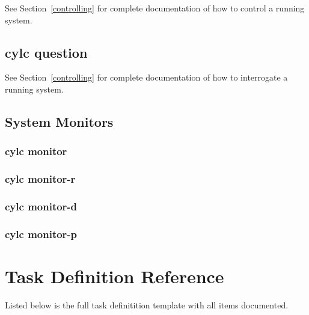 \documentclass[11pt,a4paper]{article}
\begin{document}
See Section~\ref{controlling} for complete documentation of how to
control a running system.

{

}

\pagebreak
\subsection{cylc question}
\label{cylcquestion}

See Section~\ref{controlling} for complete documentation of how to
interrogate a running system.

{

}

\pagebreak
\pagebreak 
\subsection{System Monitors}
\label{Systemmonitors}

\subsubsection{cylc monitor}
\label{cylcmonitor}
{

}

\pagebreak
\subsubsection{cylc monitor-r}
\label{cylcmonitor-r}
{

}

\pagebreak
\subsubsection{cylc monitor-d}
\label{cylcmonitor-d}
{

}

\subsubsection{cylc monitor-p}
\label{cylcmonitor-p}
{

}

\pagebreak
\section{Task Definition Reference}
\label{TaskDefinitionReference}

Listed below is the full task definitition template with all items
documented.
\end{document}
